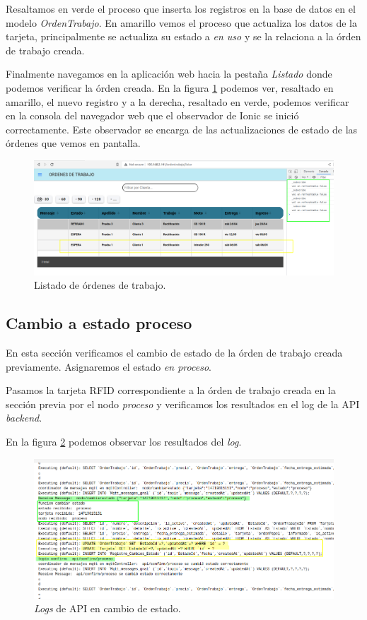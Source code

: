 Resaltamos en verde el proceso que inserta los registros en la base de datos en el modelo \textit{OrdenTrabajo}. En amarillo vemos el proceso que actualiza los datos de la tarjeta, principalmente se actualiza su estado a \textit{en uso} y se la relaciona a la órden de trabajo creada.

Finalmente navegamos en la aplicación web hacia la pestaña \textit{Listado} donde podemos verificar la órden creada. En la figura \ref{fig:ensayolistado} podemos ver, resaltado en amarillo, el nuevo registro y a la derecha, resaltado en verde, podemos verificar en la consola del navegador web que el observador de Ionic se inició correctamente. Este observador se encarga de las actualizaciones de estado de las órdenes que vemos en pantalla.

\begin{figure}[H]
	\centering
	\includegraphics[width=\textwidth]{./Figures/ensayo-1/11.listado.png}
	\caption{Listado de órdenes de trabajo.}
	\label{fig:ensayolistado}
\end{figure}

\subsection{Cambio a estado proceso}
\label{subsec:ensayoaproceso}

En esta sección verificamos el cambio de estado de la órden de trabajo creada previamente. Asignaremos el estado \textit{en proceso}.

Pasamos la tarjeta RFID correspondiente a la órden de trabajo creada en la sección previa por el nodo \textit{proceso} y verificamos los resultados en el log de la API \textit{backend}.

En la figura \ref{fig:cambioestado-api-log} podemos observar los resultados del \textit{log}.

\begin{figure}[H]
	\centering
	\includegraphics[width=\textwidth]{./Figures/ensayo-1/12.cambioestado-api-log.png}
	\caption{\textit{Logs} de API en cambio de estado.}
	\label{fig:cambioestado-api-log}
\end{figure}

